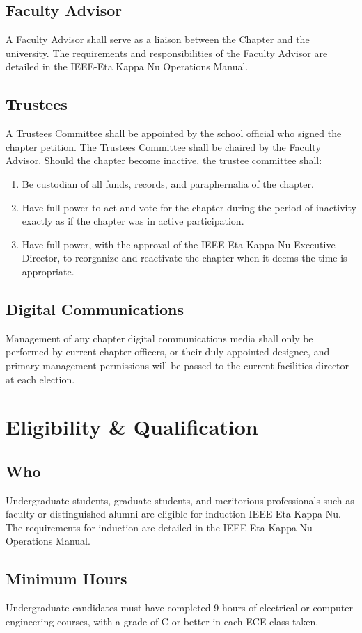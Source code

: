 \documentclass[10pt, oneside]{article}
\begin{document}
\subsection{Faculty Advisor}
A Faculty Advisor shall serve as a liaison between the Chapter and the university. The requirements and responsibilities of the Faculty Advisor are detailed in the IEEE-Eta Kappa Nu Operations Manual.
\subsection{Trustees}
A Trustees Committee shall be appointed by the school official who signed the chapter petition. The Trustees Committee shall be chaired by the Faculty Advisor. Should the chapter become inactive, the trustee committee shall:
\begin{enumerate}[label=\alph*.]
\item Be custodian of all funds, records, and paraphernalia of the chapter.
\item Have full power to act and vote for the chapter during the period of inactivity
exactly as if the chapter was in active participation.
\item Have full power, with the approval of the IEEE-Eta Kappa Nu Executive
Director, to reorganize and reactivate the chapter when it deems the time is appropriate.
\end{enumerate}
\subsection{Digital Communications}
Management of any chapter digital communications media shall only be performed by current chapter officers, or their duly appointed designee, and primary management permissions will be passed to the current facilities director at each election.

\section{Eligibility \& Qualification}
\subsection{Who}
Undergraduate students, graduate students, and meritorious professionals such as faculty or distinguished alumni are eligible for induction IEEE-Eta Kappa Nu. The requirements for induction are detailed in the IEEE-Eta Kappa Nu Operations Manual.
\subsection{Minimum Hours}
Undergraduate candidates must have completed 9 hours of electrical or computer engineering courses, with a grade of C or better in each ECE class taken.
\end{document}
